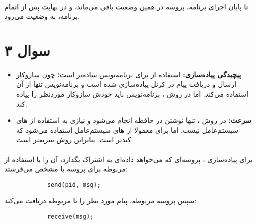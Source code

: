 \documentclass{article}
\begin{document}
	\paragraph*{}
	تا پایان اجرای برنامه، پروسه در همین وضعیت باقی می‌ماند، و در نهایت پس از اتمام برنامه، به وضعیت
	می‌رود.
	\section*{سوال ۳}
	\paragraph*{}

	\begin{itemize}
		\item{\textbf{
			پیچیدگی پیاده‌سازی:
		}}
		استفاده از
		برای برنامه‌نویس ساده‌تر است؛ چون سازوکار ارسال و دریافت پیام در کرنل پیاده‌سازی شده است و برنامه‌نویس تنها از آن استفاده می‌کند. اما در روش
		،
		برنامه‌نویس باید خودش سازوکار موردنظر را پیاده کند.

		\item{\textbf{
			سرعت:
		}}
		در روش
		،
		تنها نوشتن در حافظه انجام می‌شود و نیازی به استفاده از
		های
		سیستم‌عامل نیست. اما برای
		معمولا از
		های
		سیستم‌عامل استفاده می‌شود که کندتر است. بنابراین روش
		سریعتر است.
	\end{itemize}

	\paragraph*{}
	برای پیاده‌سازی
	،
	پروسه‌ای که می‌خواهد داده‌ای به اشتراک بگذارد، آن را با استفاده از
	مربوطه برای پروسه با
	مشخص می‌فرستد:

	\begin{latin}
		\begin{verbatim}
			send(pid, msg);
		\end{verbatim}
	\end{latin}

	سپس پروسه مربوطه، پیام مورد نظر را با
	مربوطه دریافت می‌کند:

	\begin{latin}
		\begin{verbatim}
			receive(msg);
		\end{verbatim}
	\end{latin}
\end{document}
